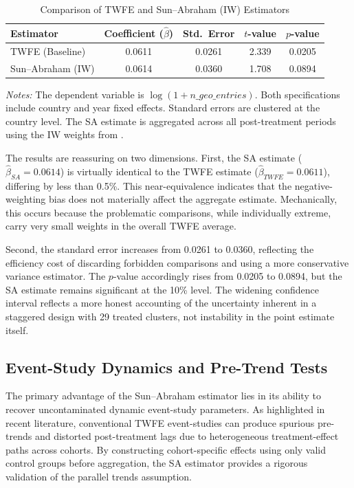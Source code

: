 \documentclass[11pt]{article}
\begin{document}
\begin{table}[htbp]
\centering
\caption{Comparison of TWFE and Sun--Abraham (IW) Estimators}
\label{tab:twfe_vs_sa}
\begin{tabular}{lcccc}
\hline
Estimator & Coefficient ($\hat{\beta}$) & Std.\ Error & $t$-value & $p$-value \\
\hline
TWFE (Baseline) & 0.0611 & 0.0261 & 2.339 & 0.0205 \\
Sun--Abraham (IW) & 0.0614 & 0.0360 & 1.708 & 0.0894 \\
\hline
\end{tabular}
\parbox{0.85\textwidth}{\small \textit{Notes:} The dependent variable is $\log(1 + n\_geo\_entries)$. Both specifications include country and year fixed effects. Standard errors are clustered at the country level. The SA estimate is aggregated across all post-treatment periods using the IW weights from \cite{sunab2021}.}
\end{table}

The results are reassuring on two dimensions. First, the SA estimate ($\hat{\beta}_{SA} = 0.0614$) is virtually identical to the TWFE estimate ($\hat{\beta}_{TWFE} = 0.0611$), differing by less than 0.5\%. This near-equivalence indicates that the negative-weighting bias does not materially affect the aggregate estimate. Mechanically, this occurs because the problematic comparisons, while individually extreme, carry very small weights in the overall TWFE average.

Second, the standard error increases from 0.0261 to 0.0360, reflecting the efficiency cost of discarding forbidden comparisons and using a more conservative variance estimator. The $p$-value accordingly rises from 0.0205 to 0.0894, but the SA estimate remains significant at the 10\% level. The widening confidence interval reflects a more honest accounting of the uncertainty inherent in a staggered design with 29 treated clusters, not instability in the point estimate itself.


\subsection{Event-Study Dynamics and Pre-Trend Tests}

The primary advantage of the Sun--Abraham estimator lies in its ability to recover uncontaminated dynamic event-study parameters. As highlighted in recent literature, conventional TWFE event-studies can produce spurious pre-trends and distorted post-treatment lags due to heterogeneous treatment-effect paths across cohorts. By constructing cohort-specific effects using only valid control groups before aggregation, the SA estimator provides a rigorous validation of the parallel trends assumption.
\end{document}
